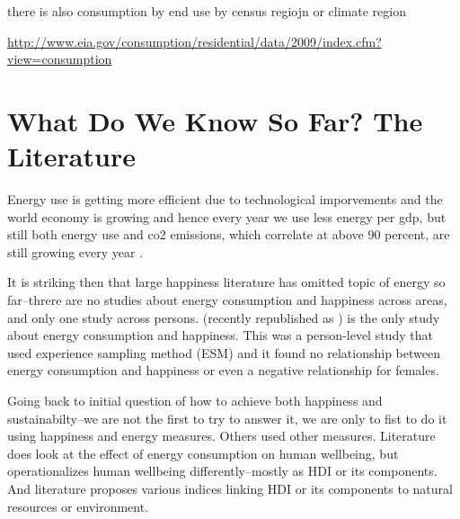\documentclass[10pt, letterpaper]{article}
\begin{document}
\begin{spacing}{1.4}
there is also consumption by end use by census regiojn or climate region

\url{http://www.eia.gov/consumption/residential/data/2009/index.cfm?view=consumption}

\section{What Do We Know So Far? The Literature}


Energy use is getting more efficient due to technological imporvements and the
world economy is growing and hence every year we use less energy per gdp, but
still both energy use and co2 emissions, which correlate at above 90 percent,
are still growing every year \citep{iea14}. 


It is striking then that large happiness literature has omitted topic of energy
so far--threre are no studies about energy consumption and happiness across
areas, and only one study across persons.  \citet{graef81} (recently republished
as \citet{csikszentmihalyi14}) is the  only study about energy consumption and
happiness. This was a person-level study that used experience
sampling method (ESM) and it found no relationship between energy consumption
and happiness or even a negative relationship for females. 


Going back to initial question of how to achieve both happiness and
sustainabilty--we are not the first to try to answer it, we are only to fist to
do it using happiness and energy measures. Others used other measures.
Literature does look at the effect of energy consumption on human
wellbeing, but operationalizes human wellbeing differently--mostly as HDI or its
components. And literature proposes various indices linking HDI or its
components to natural resources or environment.


\end{spacing}
\end{document}
